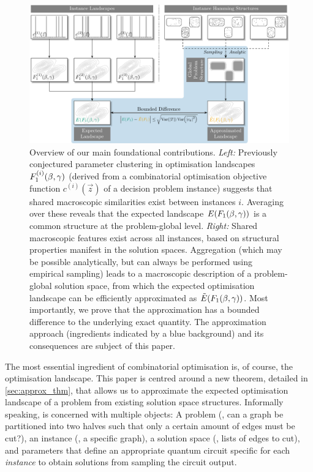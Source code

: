 \begin{figure}[htbp]
    \centering
    \includegraphics{figures/tikz/structure.pdf}
    \caption{Overview of our main foundational contributions. \emph{Left:} Previously conjectured parameter clustering in \QAOA optimisation landscapes  \(F_{1}^{(i)}(\beta, \gamma)\) (derived
    from a combinatorial optimisation objective function \(c^{(i)}(\vec{z})\)
    of a decision problem instance) suggests that shared macroscopic similarities exist between instances \(i\). Averaging over these reveals that the expected landscape \(E(F_{1}(\beta, \gamma))\) is a common structure at the problem-global level. 
    \emph{Right:} Shared macroscopic features exist across all instances, based on structural properties manifest in the solution spaces. Aggregation (which may be possible analytically, but can always be performed using empirical sampling) leads to a macroscopic description of a 
    problem-global solution space, from which the expected optimisation landscape 
    can be efficiently approximated as \(\tilde{E}(F_{1}(\beta, \gamma))\). Most importantly, we prove that the approximation has a bounded difference to the underlying exact quantity. The approximation approach (ingredients indicated
    by a blue background)  and its consequences are subject of this paper.}\label{fig:overview}
\end{figure}



The most essential ingredient of combinatorial optimisation is, of course, 
the optimisation landscape. This paper is centred around
a new theorem, detailed in \cref{sec:approx_thm}, that allows us to 
approximate the expected \QAOA optimisation landscape of a problem from 
existing solution space structures. Informally speaking, 
\QAOA is concerned with multiple objects: A problem (\eg, can a graph be 
partitioned into two halves such that only a certain amount of edges must be 
cut?), an instance (\eg, a specific graph), a solution space (\eg, lists of edges to cut), and parameters that define an appropriate quantum circuit 
specific for each \emph{instance} to obtain solutions from sampling the circuit output.

